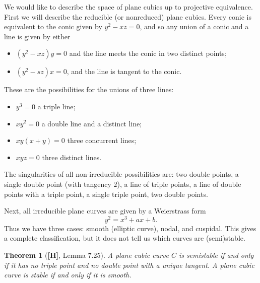 \documentclass[leqno, openany]{memoir}
\newtheorem{thm}{Theorem}[section]
\theoremstyle{definition}
\theoremstyle{remark}
\theoremstyle{plain}
\theoremstyle{definition}
\theoremstyle{remark}
\begin{document}
We would like to describe the space of plane cubics up to projective equivalence. First we will describe the reducible (or nonreduced) plane cubics. Every conic is equivalent to the conic given by $y^2 - xz = 0$, and so any union of a conic and a line is given by either
\begin{itemize}
    \item $(y^2 - xz)y = 0$ and the line meets the conic in two distinct points;
    \item $(y^2 - sz)x = 0$, and the line is tangent to the conic.
\end{itemize}
These are the possibilities for the unions of three lines:
\begin{itemize}
    \item $y^3 = 0$ a triple line;
    \item $xy^2 = 0$ a double line and a distinct line;
    \item $xy(x+y) = 0$ three concurrent lines;
    \item $xyz = 0$ three distinct lines.
\end{itemize}
The singularities of all non-irreducible possibilities are: two double points, a single double point (with tangency $2$), a line of triple points, a line of double points with a triple point, a single triple point, two double points.

Next, all irreducible plane curves are given by a Weierstrass form 
\[ y^2 = x^3 + ax + b. \]
Thus we have three cases: smooth (elliptic curve), nodal, and cuspidal. This gives a complete classification, but it does not tell us which curves are (semi)stable.

\begin{thm}[\textbf{[H]}, Lemma 7.25]
    A plane cubic curve $C$ is semistable if and only if it has no triple point and no double point with a unique tangent. A plane cubic curve is stable if and only if it is smooth.
\end{thm}
\end{document}
